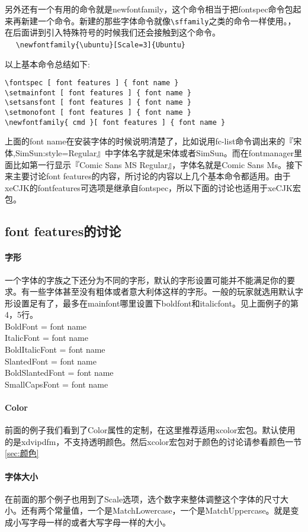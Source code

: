 另外还有一个有用的命令就是newfontfamily，这个命令相当于把fontspec命令包起来再新建一个命令。新建的那些字体命令就像\verb+\sffamily+之类的命令一样使用。，在后面讲到引入特殊符号的时候我们还会接触到这个命令。\\　
\verb+\newfontfamily{\ubuntu}[Scale=3]{Ubuntu}+

以上基本命令总结如下:
\newpage
\begin{verbatim}
\fontspec [ font features ] { font name }
\setmainfont [ font features ] { font name }
\setsansfont [ font features ] { font name }
\setmonofont [ font features ] { font name }
\newfontfamily{ cmd }[ font features ] { font name }
\end{verbatim}
上面的font name在安装字体的时候说明清楚了，比如说用fc-list命令调出来的『宋体,SimSun:style=Regular』中字体名字就是宋体或者SimSun。而在fontmanager里面比如第一行显示『Comic Sans MS Regular』，字体名就是Comic Sans Ms。接下来主要讨论font features的内容，所讨论的内容以上几个基本命令都适用。由于xeCJK的fontfeatures可选项是继承自fontspec，所以下面的讨论也适用于xeCJK宏包。

\subsection{font features的讨论}
\paragraph{字形}
一个字体的字族之下还分为不同的字形，默认的字形设置可能并不能满足你的要求。有一些字体甚至没有粗体或者意大利体这样的字形。一般的玩家就选用默认字形设置足有了，最多在mainfont哪里设置下boldfont和italicfont。见上面例子的第4，5行。\\
BoldFont = font name\\
ItalicFont = font name\\
BoldItalicFont = font name\\
SlantedFont = font name\\
BoldSlantedFont = font name\\
SmallCapsFont = font name

\paragraph{Color}
前面的例子我们看到了Color属性的定制，在这里推荐适用xcolor宏包。\XeLaTeX 默认使用的是xdvipdfm，不支持透明颜色。然后xcolor宏包对于颜色的讨论请参看颜色一节\ref{sec:颜色}

\paragraph{字体大小}
在前面的那个例子也用到了Scale选项，选个数字来整体调整这个字体的尺寸大小。还有两个常量值，一个是MatchLowercase，一个是MatchUppercase。就是变成小写字母一样的或者大写字母一样的大小。


